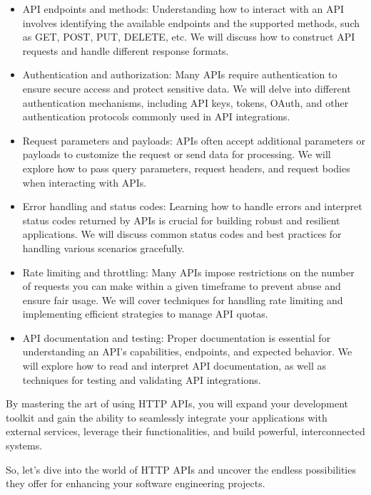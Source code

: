 \begin{itemize}
\item API endpoints and methods: Understanding how to interact with an
  API involves identifying the available endpoints and the supported
  methods, such as GET, POST, PUT, DELETE, etc. We will discuss how to
  construct API requests and handle different response formats.

\item Authentication and authorization: Many APIs require
  authentication to ensure secure access and protect sensitive
  data. We will delve into different authentication mechanisms,
  including API keys, tokens, OAuth, and other authentication
  protocols commonly used in API integrations.

\item Request parameters and payloads: APIs often accept additional
  parameters or payloads to customize the request or send data for
  processing. We will explore how to pass query parameters, request
  headers, and request bodies when interacting with APIs.

\item Error handling and status codes: Learning how to handle errors
  and interpret status codes returned by APIs is crucial for building
  robust and resilient applications. We will discuss common status
  codes and best practices for handling various scenarios gracefully.

\item Rate limiting and throttling: Many APIs impose restrictions on
  the number of requests you can make within a given timeframe to
  prevent abuse and ensure fair usage. We will cover techniques for
  handling rate limiting and implementing efficient strategies to
  manage API quotas.

\item API documentation and testing: Proper documentation is essential
  for understanding an API's capabilities, endpoints, and expected
  behavior. We will explore how to read and interpret API
  documentation, as well as techniques for testing and validating API
  integrations.
\end{itemize}

By mastering the art of using HTTP APIs, you will expand your
development toolkit and gain the ability to seamlessly integrate your
applications with external services, leverage their functionalities,
and build powerful, interconnected systems.

So, let's dive into the world of HTTP APIs and uncover the endless
possibilities they offer for enhancing your software engineering
projects.
